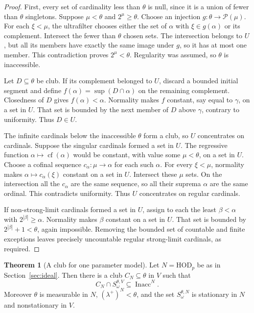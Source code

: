 \documentclass[11pt,letterpaper]{article}
\theoremstyle{definition}
\newtheorem{theorem}[definition]{Theorem}
\numberwithin{equation}{section}
\newcommand{\HOD}{\mathrm{HOD}}
\newcommand{\cf}{\operatorname{cf}}
\newcommand{\Pow}{\mathcal P}
\newcommand{\Inacc}{\operatorname{Inacc}}
\begin{document}
\begin{proof}
First, every set of cardinality less than $\theta$ is null, since it is a union of fewer than $\theta$ singletons. Suppose $\mu<\theta$ and $2^\mu\geq\theta$. Choose an injection $g:\theta\to\Pow(\mu)$. For each $\xi<\mu$, the ultrafilter chooses either the set of $\alpha$ with $\xi\in g(\alpha)$ or its complement. Intersect the fewer than $\theta$ chosen sets. The intersection belongs to $U$, but all its members have exactly the same image under $g$, so it has at most one member. This contradiction proves $2^\mu<\theta$. Regularity was assumed, so $\theta$ is inaccessible.

Let $D\subseteq\theta$ be club. If its complement belonged to $U$, discard a bounded initial segment and define $f(\alpha)=\sup(D\cap\alpha)$ on the remaining complement. Closedness of $D$ gives $f(\alpha)<\alpha$. Normality makes $f$ constant, say equal to $\gamma$, on a set in $U$. That set is bounded by the next member of $D$ above $\gamma$, contrary to uniformity. Thus $D\in U$.

The infinite cardinals below the inaccessible $\theta$ form a club, so $U$ concentrates on cardinals. Suppose the singular cardinals formed a set in $U$. The regressive function $\alpha\mapsto\cf(\alpha)$ would be constant, with value some $\mu<\theta$, on a set in $U$. Choose a cofinal sequence $c_\alpha:\mu\to\alpha$ for each such $\alpha$. For every $\xi<\mu$, normality makes $\alpha\mapsto c_\alpha(\xi)$ constant on a set in $U$. Intersect these $\mu$ sets. On the intersection all the $c_\alpha$ are the same sequence, so all their suprema $\alpha$ are the same ordinal. This contradicts uniformity. Thus $U$ concentrates on regular cardinals.

If non-strong-limit cardinals formed a set in $U$, assign to each the least $\beta<\alpha$ with $2^{|\beta|}\geq\alpha$. Normality makes $\beta$ constant on a set in $U$. That set is bounded by $2^{|\beta|}+1<\theta$, again impossible. Removing the bounded set of countable and finite exceptions leaves precisely uncountable regular strong-limit cardinals, as required.
\end{proof}

\begin{theorem}[A club for one parameter model]\label{thm:oneclub}
Let $N=\HOD_p$ be as in Section~\ref{sec:ideal}. Then there is a club $C_N\subseteq\theta$ in $V$ such that
\[
C_N\cap S_\omega^{\theta,V}\subseteq\Inacc^N.
\]
Moreover $\theta$ is measurable in $N$, $(\lambda^+)^N<\theta$, and the set $S_\omega^{\theta,N}$ is stationary in $N$ and nonstationary in $V$.
\end{theorem}
\end{document}
